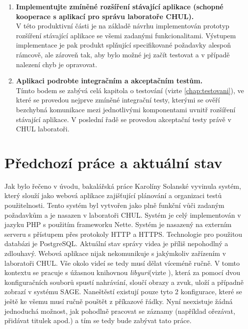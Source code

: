 \documentclass[thesis=M,czech]{FITthesis}[2012/06/26]
\begin{document}
\begin{enumerate}
	\item \textbf{Implementujte zmíněné rozšíření stávající aplikace (schopné kooperace s aplikací pro správu laboratoře
CHUL).\\}
	V této produktivní části je na základě návrhu implementován prototyp rozšíření stávající aplikace se všemi zadanými funkcionalitami. Výstupem implementace je pak produkt splňující specifikované požadavky alespoň rámcově, ale zároveň tak, aby bylo možné jej začít testovat a v případě nalezení chyb je opravovat.  
	\item \textbf{Aplikaci podrobte integračním a akceptačním testům.\\}
	Tímto bodem se zabývá celá kapitola o testování (vizte \ref{chap:testovani}), ve které se provedou nejprve zmíněné integrační testy, kterými se ověří bezchybná komunikace mezi jednotlivými komponentami uvnitř rozšíření stávající aplikace. V poslední řadě se provedou akceptační testy právě v CHUL laboratoři.
\end{enumerate}

\section{Předchozí práce a aktuální stav} \label{sec:analyza_predchozi_prace}
Jak bylo řečeno v úvodu, bakalářská práce Karolíny Solanské vyvinula systém, který slouží jako webová aplikace zajišťující plánování a organizaci testů použitelnosti. Tento systém byl vytvořen jako plně funkční vůči zadaným požadavkům a je nasazen v laboratoři CHUL. 
	Systém je celý implementován v jazyku PHP s použitím frameworku Nette. Systém je nasazený na externím serveru s přístupem přes protokoly HTTP a HTTPS. Technologie pro použitou databázi je PostgreSQL.
	Aktuální stav správy videa je příliš nepohodlný a zdlouhavý. Webová aplikace nijak nekomunikuje s jakýmkoliv zařízením v laboratoři CHUL. Vše okolo videí se tedy musí dělat víceméně ručně. V tomto kontextu se pracuje s úžasnou knihovnou \textit{libyuri}(vizte \cite{yuri}), která za pomocí dvou konfiguračních souborů spustí nahrávání, sloučí obrazy a zvuk, uloží a případně zobrazí v systému SAGE. Naneštěstí existují pouze tyto 2 konfigurace, které se ještě ke všemu musí ručně pouštět z příkazové řádky. Nyní neexistuje žádná jednoduchá možnost, jak pohodlně pracovat se záznamy (například ořezávat, přidávat titulek apod.) a tím se tedy bude zabývat tato práce.
	
\end{document}
